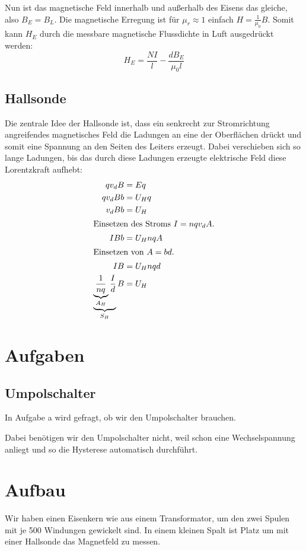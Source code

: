 \documentclass[11pt, ngerman]{article}
\begin{document}
Nun ist das magnetische Feld innerhalb und außerhalb des Eisens das gleiche, also $B_E = B_L$. Die magnetische Erregung ist für $\mu_r \approx 1$ einfach $H = \frac 1{\mu_0} B$. Somit kann $H_E$ durch die messbare magnetische Flussdichte in Luft ausgedrückt werden:
%
\begin{equation}
	\label{eq:HFe}
	H_E = \frac{NI}{l} - \frac{d B_E}{\mu_0 l}
\end{equation}

\subsection{Hallsonde}

Die zentrale Idee der Hallsonde ist, dass ein senkrecht zur Stromrichtung angreifendes magnetisches Feld die Ladungen an eine der Oberflächen drückt und somit eine Spannung an den Seiten des Leiters erzeugt. Dabei verschieben sich so lange Ladungen, bis das durch diese Ladungen erzeugte elektrische Feld diese Lorentzkraft aufhebt:
%
\begin{align*}
	q v_d B &= E q \\
	q v_d B b &= U_H q \\
	v_d B b &= U_H \\
	\intertext{Einsetzen des Stroms $I = n q v_d A$.}
	I B b &= U_H n q A \\
	\intertext{Einsetzen von $A = bd$.}
	I B &= U_H n q d \\
	\underbrace{\underbrace{\frac{1}{n q}}_{A_H} \frac Id}_{S_H} B &= U_H
\end{align*}

\section{Aufgaben}

\subsection{Umpolschalter}

In Aufgabe a wird gefragt, ob wir den Umpolschalter brauchen.

Dabei benötigen wir den Umpolschalter nicht, weil schon eine Wechselspannung
anliegt und so die Hysterese automatisch durchführt.

\section{Aufbau}

Wir haben einen Eisenkern wie aus einem Transformator, um den zwei Spulen mit je 500 Windungen gewickelt sind. In einem kleinen Spalt ist Platz um mit einer Hallsonde das Magnetfeld zu messen.
\end{document}
